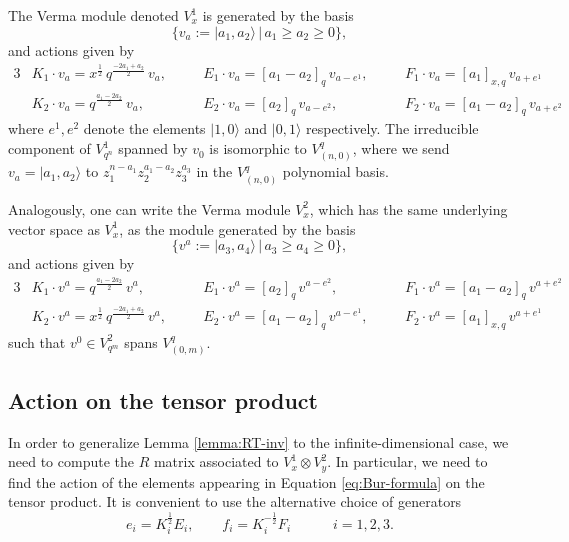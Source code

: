 \documentclass[12pt,oneside,reqno]{amsart}
\numberwithin{teorema}{section}
\numberwithin{definicion}{section}
\numberwithin{lema}{section}
\numberwithin{conjetura}{section}
\numberwithin{proposicion}{section}
\begin{document}
The Verma module denoted $V_x^1$ is generated by the basis
\begin{equation*}
    \{v_a:=|a_1,a_2\rangle \,|\, a_1\geq a_2\geq 0 \},
\end{equation*}
and actions given by
\begin{alignat}{3}
    \label{eq:Uhsl3-action-1-1} & K_1\cdot v_a = x^\frac12\,q^\frac{-2a_1+a_2}{2}\,v_a, \quad && E_1\cdot v_a=[a_1-a_2]_q\,v_{a-e^1}, \quad && F_1\cdot v_a = [a_1]_{x,q}\,v_{a+e^1} \\ \label{eq:Uhsl3-action-1-2} & K_2\cdot v_a = q^\frac{a_1-2a_2}{2}\,v_a, \quad && E_2\cdot v_a = [a_2]_q\,v_{a-e^2}, \quad && F_2\cdot v_a = [a_1-a_2]_q\,v_{a+e^2}
\end{alignat}
where $e^1,e^2$ denote the elements $|1,0\rangle$ and $|0,1\rangle$ respectively. The irreducible component of $V_{q^n}^1$ spanned by $v_0$ is isomorphic to $V^q_{(n,0)}$, where we send $v_a=|a_1,a_2\rangle$ to $z_1^{n-a_1}z_2^{a_1-a_2}z_3^{a_3}$ in the $V^q_{(n,0)}$ polynomial basis.

Analogously, one can write the Verma module $V_x^2$, which has the same underlying vector space as $V_x^1$, as the module generated by the basis
\begin{equation*}
    \{v^a:=|a_3,a_4\rangle \,|\, a_3\geq a_4\geq 0 \},
\end{equation*}
and actions given by 
\begin{alignat}{3}
    \label{eq:Uhsl3-action-2-1} & K_1\cdot v^a = q^\frac{a_1-2a_2}{2}\,v^a, \quad && E_1\cdot v^a = [a_2]_q\,v^{a-e^2}, \quad && F_1\cdot v^a = [a_1-a_2]_q\,v^{a+e^2} \\
    \label{eq:Uhsl3-action-2-2} & K_2\cdot v^a = x^\frac12\,q^\frac{-2a_1+a_2}{2}\,v^a, \quad && E_2\cdot v^a=[a_1-a_2]_q\,v^{a-e^1}, \quad && F_2\cdot v^a = [a_1]_{x,q}\,v^{a+e^1}
\end{alignat}
such that $v^0\in V^2_{q^m}$ spans $V^q_{(0,m)}$.

\subsection{Action on the tensor product}

In order to generalize Lemma \ref{lemma:RT-inv} to the infinite-dimensional case, we need to compute the $R$ matrix associated to $V_{x}^{1}\otimes V_{y}^{2}$. In particular, we need to find the action of the elements appearing in Equation \eqref{eq:Bur-formula} on the tensor product. It is convenient to use the alternative choice of generators
\begin{equation*}
    e_i=K_i^{\frac12} E_i, \hspace{2em} f_i=K_i^{-\frac12}F_i \hspace{3em} i=1,2,3.
\end{equation*}
\end{document}
